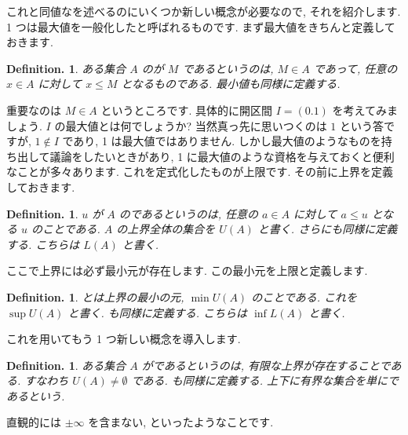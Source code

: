 \documentclass[openany, a4paper, oneside]{jsbook}
\theoremstyle{break}
\theoremstyle{breakdefn}
\newtheorem{defn}[thm]{Definition.}
\begin{document}
これと同値なを述べるのにいくつか新しい概念が必要なので, それを紹介します.
1 つは最大値を一般化したと呼ばれるものです.
まず最大値をきちんと定義しておきます.
\begin{defn}
ある集合 $A$ のが $M$ であるというのは,  $M\in A$ であって,
任意の $x\in A$ に対して $x\leq M$ となるものである. 最小値も同様に定義する.
\end{defn}
重要なのは $M\in A$ というところです.
具体的に開区間 $I=(0.1)$ を考えてみましょう.
 $I$ の最大値とは何でしょうか?
当然真っ先に思いつくのは $1$ という答ですが,  $1\notin I$ であり, 1 は最大値ではありません.
しかし最大値のようなものを持ち出して議論をしたいときがあり,
1 に最大値のような資格を与えておくと便利なことが多々あります.
これを定式化したものが上限です.
その前に上界を定義しておきます.
\begin{defn}
$u$ が $A$ のであるというのは, 任意の $a\in A$ に対して $a\leq u$ となる $u$ のことである.
$A$ の上界全体の集合を $U (A)$ と書く.
さらにも同様に定義する. こちらは $L (A)$ と書く.
\end{defn}
ここで上界には必ず最小元が存在します.
この最小元を上限と定義します.
\begin{defn}
とは上界の最小の元,  $\min U (A)$ のことである.
これを $\sup U (A)$ と書く.
も同様に定義する. こちらは $\inf L (A)$ と書く.
\end{defn}
これを用いてもう 1 つ新しい概念を導入します.
\begin{defn}
ある集合 $A$ がであるというのは, 有限な上界が存在することである.
すなわち $U (A)\not=\emptyset$ である. も同様に定義する.
上下に有界な集合を単にであるという.
\end{defn}
直観的には $\pm\infty$ を含まない, といったようなことです.
\end{document}
